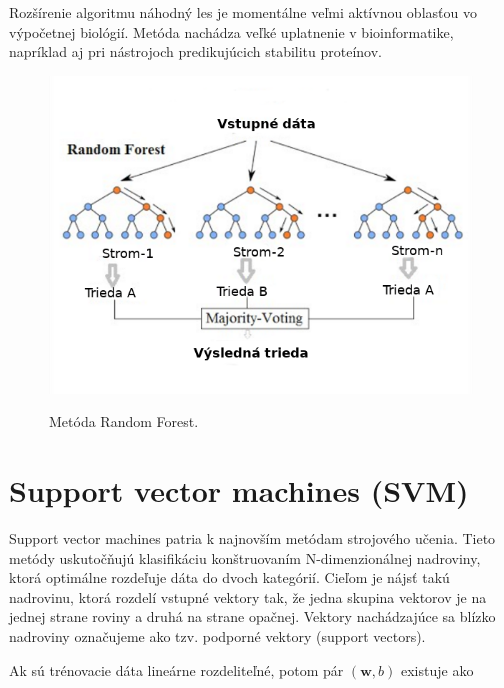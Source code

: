 Rozšírenie algoritmu náhodný les je momentálne veľmi aktívnou oblasťou vo výpočetnej biológií. Metóda nachádza veľké uplatnenie v bioinformatike, napríklad aj pri nástrojoch predikujúcich stabilitu proteínov.

\begin{figure}[H]
	\centering
	\begin{center}
		\scalebox{0.8}
		{   
			\includegraphics{rf.png}
		}
		\caption[Random Forest]{Metóda Random Forest\footnotemark.}
		\label{random_forest}
	\end{center}
\end{figure}

\section {Support vector machines (SVM)}

Support vector machines patria k najnovším metódam strojového učenia. Tieto metódy uskutočňujú klasifikáciu konštruovaním N-dimenzionálnej nadroviny, ktorá optimálne rozdeľuje dáta do dvoch kategórií. Cieľom je nájsť takú nadrovinu, ktorá rozdelí vstupné vektory tak, že jedna skupina vektorov je na jednej strane roviny a druhá na strane opačnej. Vektory nachádzajúce sa blízko nadroviny označujeme ako tzv. podporné vektory (support vectors). 

Ak sú trénovacie dáta lineárne rozdeliteľné, potom pár $(\textbf{w},b)$ existuje ako 

